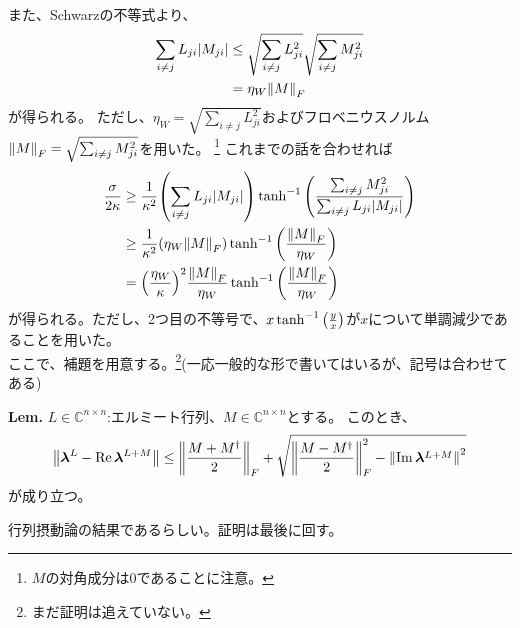 \documentclass[a4paper,11pt]{jsarticle}
\numberwithin{equation}{section}
\begin{document}
また、Schwarzの不等式より、
\begin{align}
    \sum_{i \neq j} L_{ji} \abs{M_{ji}} &\leq \sqrt{\sum_{i \neq j} L_{ji}^2} \sqrt{\sum_{i \neq j} M_{ji}^2}\\
    &= \eta_{W} \norm{M}_F
\end{align}
が得られる。
ただし、$\eta_{W} = \sqrt{\sum_{i \neq j} L_{ji}^2}$およびフロベニウスノルム$\norm{M}_F = \sqrt{\sum_{i \neq j} M_{ji}^2}$を用いた。
\footnote{$M$の対角成分は$0$であることに注意。}
これまでの話を合わせれば
\begin{align}
    \frac{\sigma}{2\kappa} &\geq \frac{1}{\kappa^2} \qty(\sum_{i \neq j} L_{ji}\abs{M_{ji}}) \tanh^{-1} \qty(\frac{\sum_{i \neq j}M_{ji}^2}{\sum_{i \neq j} L_{ji}\abs{M_{ji}}})\\
    &\geq \frac{1}{\kappa^2} \qty(\eta_{W} \norm{M}_F) \tanh^{-1} \qty(\frac{\norm{M}_F}{\eta_{W}})\\
    &= \qty(\frac{\eta_{W}}{\kappa})^2 \frac{\norm{M}_F}{\eta_{W}} \tanh^{-1} \qty(\frac{\norm{M}_F}{\eta_{W}})
\end{align}
が得られる。ただし、2つ目の不等号で、$x\tanh^{-1} \qty(\frac{y}{x})$が$x$について単調減少であることを用いた。\\

ここで、補題を用意する。\footnote{まだ証明は追えていない。}(一応一般的な形で書いてはいるが、記号は合わせてある)
\begin{itembox}[l]{\textbf{Lem.}}
    $L \in \mathbb{C}^{n \times n}$:エルミート行列、$M \in \mathbb{C}^{n \times n}$とする。
    このとき、
    \begin{align}
        \norm{\bm{\lambda}^L - \Re \bm{\lambda}^{L + M}} \leq 
        \norm{\frac{M + M^{\dagger}}{2}}_F+ \sqrt{\norm{\frac{M - M^{\dagger}}{2}}_F^2 - \norm{\Im \bm{\lambda}^{L + M}}^2}
    \end{align}
    が成り立つ。
\end{itembox}
行列摂動論の結果であるらしい。証明は最後に回す。
\end{document}
